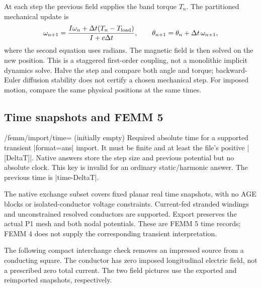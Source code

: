 At each step the previous field supplies the band torque $T_n$. The partitioned
mechanical update is
\[
 \omega_{n+1}=\frac{I\omega_n+\Delta t(T_n-T_{\rm load})}{I+c\Delta t},
 \qquad \theta_{n+1}=\theta_n+\Delta t\,\omega_{n+1},
\]
where the second equation uses radians. The magnetic field is then solved on
the new position. This is a staggered first-order coupling, not a monolithic
implicit dynamics solve. Halve the step and compare both angle and torque;
backward-Euler diffusion stability does not certify a chosen mechanical step.
For imposed motion, compare the same physical positions at the same times.

\subsection{Time snapshots and FEMM 5}
\label{sec:time-exchange}
\begin{key}{/femm/import/time= (initially empty)}
Required absolute time for a supported transient |format=ans| import. It must be
finite and at least the file's positive |[DeltaT]|. Native answers store the step
size and previous potential but no absolute clock. This key is invalid for an
ordinary static/harmonic answer. The previous time is |time-DeltaT|.
\end{key}

The native exchange subset covers fixed planar real time snapshots, with no
AGE blocks or isolated-conductor voltage constraints. Current-fed stranded
windings and unconstrained resolved conductors are supported. Export preserves
the actual P1 mesh and both nodal potentials. These are FEMM 5 time records;
FEMM 4 does not supply the corresponding transient interpretation.

The following compact interchange check removes an impressed source from a
conducting square. The conductor has zero imposed longitudinal electric field,
not a prescribed zero total current. The two field pictures use the exported
and reimported snapshots, respectively.

\begin{codeexample}[width=0pt]
\end{codeexample}

